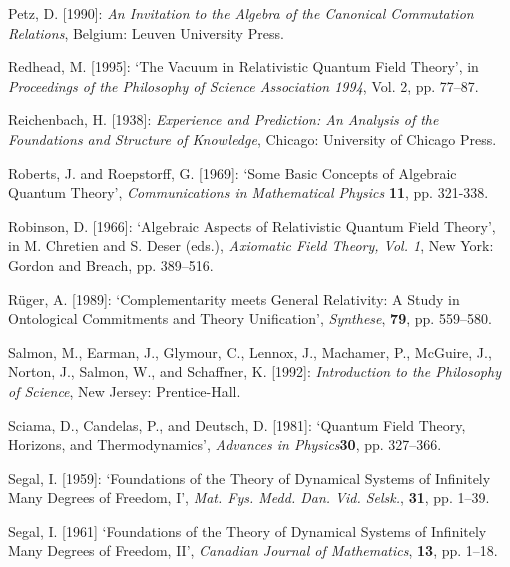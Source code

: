 \documentclass[12pt]{article}
\theoremstyle{remark}
\theoremstyle{definition}
\begin{document}
  \noindent Petz, D. [1990]: \textit{An Invitation to the Algebra of 
  the Canonical Commutation Relations}, Belgium: 
  Leuven University Press.\vspace{.1in}
  
 \noindent Redhead, M. [1995]: `The Vacuum in Relativistic Quantum Field Theory',
in \textit{Proceedings of the Philosophy of Science Association 1994}, Vol.
2, pp. 77--87.\vspace{.1in}
  
\noindent Reichenbach, H. [1938]: \textit{Experience and Prediction: An Analysis of
the Foundations and Structure of Knowledge}, Chicago: University of Chicago
Press.\vspace{.1in}

\noindent Roberts, J. and Roepstorff, G. [1969]: `Some Basic Concepts of Algebraic
Quantum Theory', \textit{Communications in Mathematical Physics}
 \textbf{11}, pp. 321-338.\vspace{.1in}

\noindent Robinson, D. [1966]: `Algebraic Aspects of Relativistic Quantum Field
Theory', in M. Chretien and S. Deser (eds.), \textit{Axiomatic Field Theory,
Vol. 1}, New York: Gordon and Breach, pp. 389--516.\vspace{.1in}

\noindent R\"{u}ger, A. [1989]: `Complementarity meets General Relativity: A Study in
Ontological Commitments and Theory Unification', \textit{Synthese}, \textbf{79}, 
pp. 559--580.\vspace{.1in}

\noindent Salmon, M., Earman, J., Glymour, C., Lennox, J., Machamer, 
P., McGuire, J., Norton, J., Salmon, W., and Schaffner, K. [1992]: 
\emph{Introduction to the Philosophy of Science}, New Jersey: 
Prentice-Hall.\vspace{.1in}

\noindent Sciama, D., Candelas, P., and Deutsch, D. [1981]: `Quantum 
Field Theory, Horizons, and Thermodynamics', \textit{Advances in 
Physics}\textbf{30}, 
pp. 327--366.\vspace{.1in}

\noindent Segal, I. [1959]: `Foundations of the Theory of Dynamical Systems of
Infinitely Many Degrees of Freedom, I', {\it Mat. Fys. Medd. Dan. Vid.
  Selsk.}, {\bf 31}, pp. 1--39.\vspace{.1in}
  
  \noindent Segal, I. [1961] `Foundations of the Theory of Dynamical Systems of
Infinitely Many Degrees of Freedom, II', {\it Canadian Journal of 
Mathematics}, {\bf 13}, pp. 
1--18.\vspace{.1in}
\end{document}
